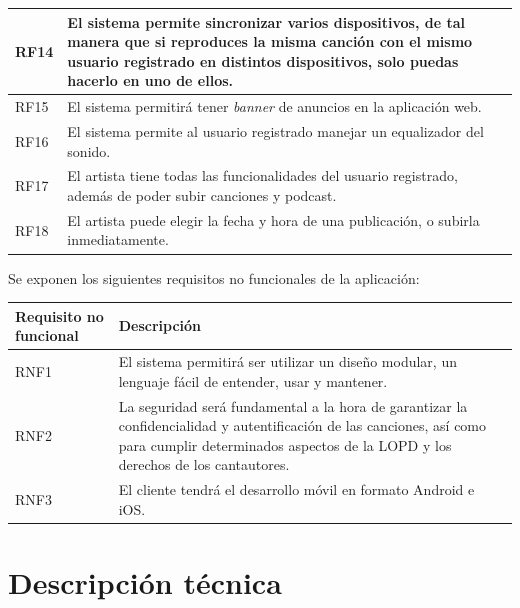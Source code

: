 \documentclass{article}
\begin{document}
\begin{table}[H]
\begin{tabular}{p{4cm} p{10cm}}
		\hline
		RF14
		&  El sistema permite sincronizar varios dispositivos, de tal manera que si reproduces la misma canción con el mismo usuario registrado en distintos dispositivos, solo puedas hacerlo en uno de ellos.\\
		\hline
		RF15
		&  El sistema permitirá tener \textit{banner} de anuncios en la aplicación web.\\
		\hline
		RF16
		& El sistema permite al usuario registrado manejar un equalizador del sonido. \\ 
		\hline
		RF17
		& El artista tiene todas las funcionalidades del usuario registrado, además de poder subir canciones y podcast. \\ 
		\hline
		RF18
		& El artista puede elegir la fecha y hora de una publicación, o subirla inmediatamente. \\ 
		\hline
	\end{tabular}
\end{table}
\break
Se exponen los siguientes requisitos no funcionales de la aplicación:

\begin{table}[H]
	\begin{tabular}{p{4cm} p{10cm}}
		\hline
		\hline 
		\textbf{Requisito no funcional} & \textbf{Descripción} \\ 
		\hline
		\hline
		RNF1 
		&  El sistema permitirá ser utilizar un diseño modular, un lenguaje fácil de entender, usar y mantener.\\ 
		\hline
		RNF2
		&  La seguridad será fundamental a la hora de garantizar la confidencialidad y autentificación de las canciones, así como para cumplir determinados aspectos de la LOPD y los derechos de los cantautores.\\ 
		\hline
		RNF3
		&  El cliente tendrá el desarrollo móvil en formato Android e iOS.\\ 
		\hline
	\end{tabular}
\end{table}
\newpage

\section{Descripción técnica}
\end{document}
